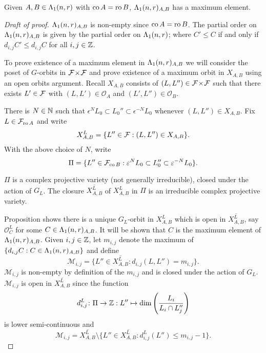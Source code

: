 \documentclass[a4paper, 11pt]{report}
\begin{document}
\begin{proposition}\label{proposition:existence-maximum}
Given $A,B\in\Lambda_1(n,r)$ with $\operatorname{co}{A}=\operatorname{ro}{B}$, $\Lambda_1(n,r)_{A,B}$ has a maximum element.
\end{proposition}

\begin{proof}[Draft of proof]
$\Lambda_1(n,r)_{A,B}$ is non-empty since $\operatorname{co}{A}=\operatorname{ro}{B}$. The partial order on $\Lambda_1(n,r)_{A,B}$ is given by the partial order on $\Lambda_1(n,r)$; where $C'\le C$ if and only if $d_{i,j}C'\le d_{i,j}C$ for all $i,j\in\mathbb{Z}$.

To prove existence of a maximum element in $\Lambda_1(n,r)_{A,B}$ we will consider the poset of $G$-orbits in ${\mathcal{F}\!\times\!\mathcal{F}}$ and prove existence of a maximum orbit in $X_{A,B}$ using an open orbits argument. Recall $X_{A,B}$ consists of $(L,L'')\in{\mathcal{F}\!\times\!\mathcal{F}}$ such that there exists $L'\in\mathcal{F}$ with $(L,L')\in\mathcal{O}_A$ and $(L',L'')\in\mathcal{O}_B$.

There is $N\in\mathbb{N}$ such that $\epsilon^N L_0\subset L_0''\subset \epsilon^{-N}L_0$ whenever $(L,L'')\in X_{A,B}$. Fix $L\in\mathcal{F}_{\operatorname{ro}{A}}$ and write
\begin{equation*}
X_{A,B}^L = \{L''\in\mathcal{F}: (L,L'')\in X_{A,B}\}.
\end{equation*}
With the above choice of $N$, write
\begin{equation*}
\Pi = \{L''\in\mathcal{F}_{\operatorname{co}{B}}: \varepsilon^N L_0\subset L_0''\subset \varepsilon^{-N} L_0\}.
\end{equation*}

$\Pi$ is a complex projective variety (not generally irreducible), closed under the action of $G_L$. \needsreference The closure $\overline{X_{A,B}^L}$ of $X_{A,B}^L$ in $\Pi$ is an irreducible complex projective variety.

Proposition \needsreference shows there is a unique $G_L$-orbit in $X_{A,B}^L$ which is open in $\overline{X_{A,B}^L}$, say $\mathcal{O}_C^L$ for some $C\in\Lambda_1(n,r)_{A,B}$. It will be shown that $C$ is the maximum element of $\Lambda_1(n,r)_{A,B}$. Given $i,j\in\mathbb{Z}$, let $m_{i,j}$ denote the maximum of $\{d_{i,j}C: C\in\Lambda_1(n,r)_{A,B}\}$ and define
\begin{equation*}
\mathcal{M}_{i,j} = \{L''\in \overline{X_{A,B}^L}: d_{i,j}(L,L'') = m_{i,j}\}.
\end{equation*}
$\mathcal{M}_{i,j}$ is non-empty by definition of the $m_{i,j}$ and is closed under the action of $G_L$. $\mathcal{M}_{i,j}$ is open in $\overline{X_{A,B}^L}$ since the function
\begin{equation*}
d_{i,j}^L\colon\Pi\to\mathbb{Z}: L''\mapsto \dim\left(\frac{L_i}{L_i\cap L_j''}\right)
\end{equation*}
is lower semi-continuous \needsreference and
\begin{equation*}
\mathcal{M}_{i,j} = \overline{X_{A,B}^L}\setminus \{L''\in\overline{X_{A,B}^L}: d_{i,j}^L(L'')\le m_{i,j} -1\}.
\end{equation*}


\end{proof}
\end{document}
